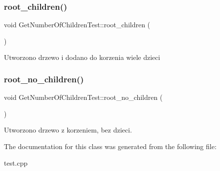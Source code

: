 \subsubsection{\texorpdfstring{root\+\_\+children()}{root\_children()}}
{\footnotesize\ttfamily void Get\+Number\+Of\+Children\+Test\+::root\+\_\+children (\begin{DoxyParamCaption}{ }\end{DoxyParamCaption})\hspace{0.3cm}{\ttfamily [inline]}}

Utworzono drzewo i dodano do korzenia wiele dzieci \mbox{\label{class_get_number_of_children_test_ab43b852fd1b487614fbb1799b54f723a}} 
\subsubsection{\texorpdfstring{root\+\_\+no\+\_\+children()}{root\_no\_children()}}
{\footnotesize\ttfamily void Get\+Number\+Of\+Children\+Test\+::root\+\_\+no\+\_\+children (\begin{DoxyParamCaption}{ }\end{DoxyParamCaption})\hspace{0.3cm}{\ttfamily [inline]}}

Utworzono drzewo z korzeniem, bez dzieci. 

The documentation for this class was generated from the following file\+:\begin{DoxyCompactItemize}
\item 
test.\+cpp\end{DoxyCompactItemize}
